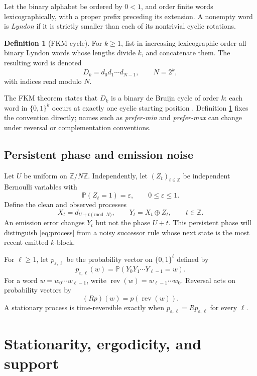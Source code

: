 \documentclass[11pt,a4paper]{amsart}
\theoremstyle{definition}
\newtheorem{definition}[theorem]{Definition}
\theoremstyle{remark}
\newcommand{\Z}{\mathbb Z}
\newcommand{\Prob}{\mathbb P}
\newcommand{\rev}{\operatorname{rev}}
\begin{document}
Let the binary alphabet be ordered by $0<1$, and order finite words
lexicographically, with a proper prefix preceding its extension.  A
nonempty word is \emph{Lyndon} if it is strictly smaller than each of its
nontrivial cyclic rotations.

\begin{definition}[FKM cycle]\label{def:fkm}
For $k\geq 1$, list in increasing lexicographic order all binary Lyndon words
whose lengths divide $k$, and concatenate them.  The resulting word is
denoted
\[
 D_k=d_0d_1\cdots d_{N-1},\qquad N=2^k,
\]
with indices read modulo $N$.
\end{definition}

The FKM theorem states that $D_k$ is a binary de Bruijn cycle of order $k$:
each word in $\{0,1\}^k$ occurs at exactly one cyclic starting position
\cite{FredricksenMaiorana1978,AmramEtAl2025}.  Definition
\ref{def:fkm} fixes the convention directly; names such as
\emph{prefer-min} and \emph{prefer-max} can change under reversal or
complementation conventions.

\subsection{Persistent phase and emission noise}

Let $U$ be uniform on $\Z/N\Z$.  Independently, let
$(Z_t)_{t\in\Z}$ be independent Bernoulli variables with
\[
 \Prob(Z_t=1)=\varepsilon,\qquad 0\leq\varepsilon\leq 1.
\]
Define the clean and observed processes
\begin{equation}\label{eq:process}
 X_t=d_{U+t\pmod N},
 \qquad
 Y_t=X_t\oplus Z_t,
 \qquad t\in\Z.
\end{equation}
An emission error changes $Y_t$ but not the phase $U+t$.  This persistent
phase will distinguish \eqref{eq:process} from a noisy successor rule whose
next state is the most recent emitted $k$-block.

For $\ell\geq1$, let $p_{\varepsilon,\ell}$ be the probability vector on
$\{0,1\}^{\ell}$ defined by
\[
 p_{\varepsilon,\ell}(w)
 =\Prob(Y_0Y_1\cdots Y_{\ell-1}=w).
\]
For a word $w=w_0\cdots w_{\ell-1}$, write
$\rev(w)=w_{\ell-1}\cdots w_0$.  Reversal acts on probability vectors by
\[
 (Rp)(w)=p(\rev(w)).
\]
A stationary process is time-reversible exactly when
$p_{\varepsilon,\ell}=Rp_{\varepsilon,\ell}$ for every $\ell$.

\section{Stationarity, ergodicity, and support}
\end{document}

